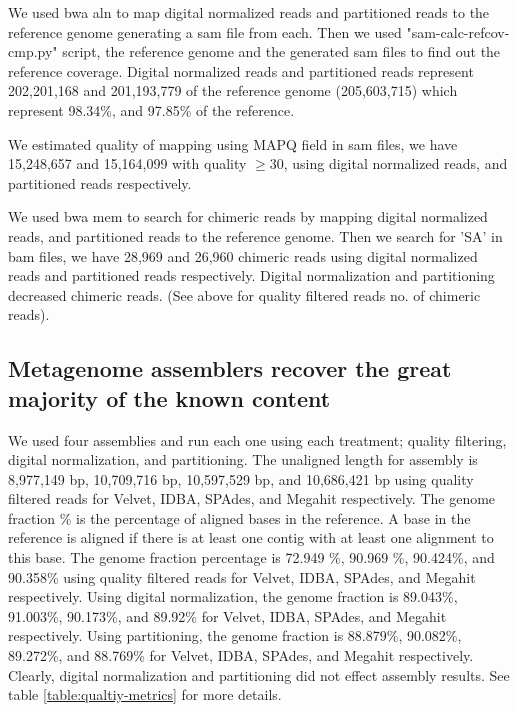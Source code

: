We used bwa aln \cite{bwa-mem} to map digital normalized reads and partitioned reads to the reference genome generating a sam file from each. Then we used  "sam-calc-refcov-cmp.py" script, the reference genome and the generated sam files to find out the reference coverage. Digital normalized reads and partitioned reads represent  202,201,168 and 201,193,779 of the reference genome (205,603,715)  which represent 98.34\%, and 97.85\%  of the reference.   


We estimated quality of mapping using MAPQ field in sam files, we have 15,248,657 and 15,164,099 with quality $\geq 30$,  using  digital normalized reads, and partitioned reads respectively. 

We used bwa mem to search for chimeric reads by mapping digital normalized reads, and partitioned reads to the reference genome. Then we search for 'SA' in bam files, we have 28,969 and  26,960 chimeric reads using digital normalized reads and partitioned reads respectively. Digital normalization and partitioning decreased chimeric reads. (See above for quality filtered reads no. of chimeric reads). 



\subsection*{Metagenome assemblers recover the great majority of the known content}   
We  used four assemblies and run each one using each treatment; quality filtering, digital normalization, and partitioning. 
The unaligned length for assembly is 8,977,149 bp, 10,709,716 bp,  10,597,529 bp, and 10,686,421 bp using quality filtered reads for Velvet, IDBA, SPAdes, and Megahit respectively. 
The genome fraction \% is the percentage of aligned bases in the reference. A base in the reference is aligned if there is at least one contig with at least one alignment to this base. 
The genome fraction percentage is 72.949 \%, 90.969 \%, 90.424\%, and 90.358\%  using quality filtered reads for Velvet, IDBA, SPAdes, and Megahit respectively. 
Using digital normalization, the genome fraction is 89.043\%, 91.003\%, 90.173\%, and 89.92\% for Velvet, IDBA, SPAdes, and Megahit respectively. 
Using partitioning, the genome fraction is 88.879\%, 90.082\%, 89.272\%, and 88.769\% for Velvet, IDBA, SPAdes, and Megahit respectively.  Clearly, digital normalization and partitioning did not effect assembly results. See table \ref{table:qualtiy-metrics} for more details.

